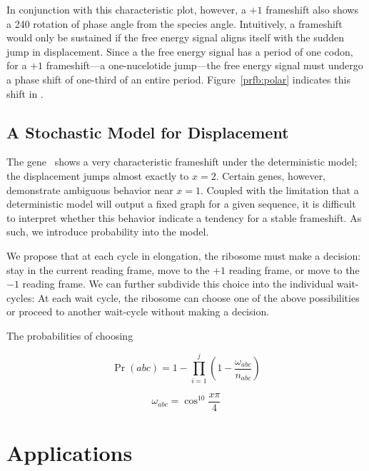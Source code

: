\documentclass[12pt, draft]{article}
\begin{document}
In conjunction with this characteristic plot, however, a $+1$ frameshift also shows a 240\degree
rotation of phase angle from the species angle.
Intuitively, a frameshift would only be sustained if the free energy signal aligns itself with the sudden jump in displacement.
Since a the free energy signal has a period of one codon, for a $+1$ frameshift---a one-nucelotide jump---the free energy signal
must undergo a phase shift of one-third of an entire period.  Figure~\ref{prfb:polar} indicates this shift in \prfB.

\subsection{A Stochastic Model for Displacement}


The gene \prfB\ shows a very characteristic frameshift under the deterministic model; the displacement jumps almost exactly to $x=2$.
Certain genes, however, demonstrate ambiguous behavior near $x = 1$.
Coupled with the limitation that a deterministic model will output a fixed graph for a given sequence, 
it is difficult to interpret whether this behavior indicate a tendency for a stable frameshift.
As such, we introduce probability into the model.

We propose that at each cycle in elongation, the ribosome must make a decision: stay in the current reading frame, move to the $+1$ reading frame,
or move to the $-1$ reading frame.  We can further subdivide this choice into the individual wait-cycles: 
At each wait cycle, the ribosome can choose one of the above possibilities or proceed to another wait-cycle without making a decision.

The probabilities of choosing

$$\Pr\left(abc\right) = 1 - \prod_{i=1}^j \left(1-\frac{\omega_{abc}}{n_{abc}}\right)$$

$$\omega_{abc} = \cos^{10}{\frac{x\pi}{4}}$$

\section{Applications}
\end{document}
